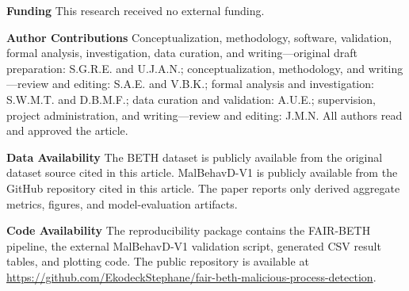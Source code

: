 \documentclass[journal]{IEEEtran}
\begin{document}
\noindent
\begin{sloppypar}
\textbf{Funding} This research received no external funding.
\end{sloppypar}

\noindent
\begin{sloppypar}
\textbf{Author Contributions} Conceptualization, methodology, software, validation, formal analysis, investigation, data curation, and writing---original draft preparation: S.G.R.E. and U.J.A.N.; conceptualization, methodology, and writing---review and editing: S.A.E. and V.B.K.; formal analysis and investigation: S.W.M.T. and D.B.M.F.; data curation and validation: A.U.E.; supervision, project administration, and writing---review and editing: J.M.N. All authors read and approved the article.
\end{sloppypar}

\noindent
\begin{sloppypar}
\textbf{Data Availability} The BETH dataset is publicly available from the original dataset source cited in this article. MalBehavD-V1 is publicly available from the GitHub repository cited in this article. The paper reports only derived aggregate metrics, figures, and model-evaluation artifacts.
\end{sloppypar}

\noindent
\begin{sloppypar}
\textbf{Code Availability} The reproducibility package contains the FAIR-BETH pipeline, the external MalBehavD-V1 validation script, generated CSV result tables, and plotting code. The public repository is available at \url{https://github.com/EkodeckStephane/fair-beth-malicious-process-detection}.
\end{sloppypar}



\end{document}
